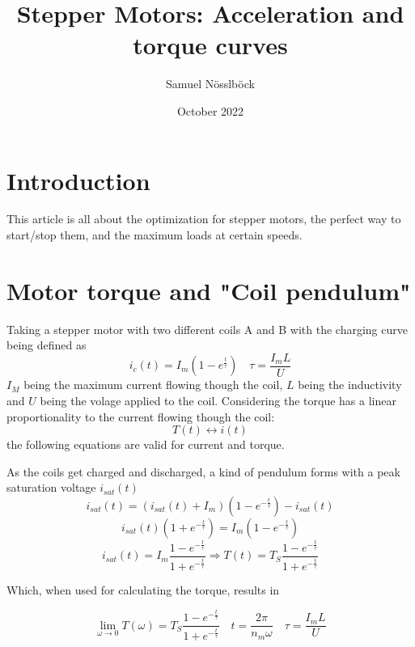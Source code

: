 \documentclass{article}
\title{Stepper Motors: Acceleration and torque curves}
\author{Samuel Nösslböck}
\date{October 2022}
\begin{document}
\maketitle

\section{Introduction}

    This article is all about the optimization for stepper motors, the perfect way to start/stop them, and the maximum loads at certain speeds.

\section{Motor torque and "Coil pendulum"}

    Taking a stepper motor with two different coils A and B with the charging curve being defined as
    \begin{equation}
        i_c(t) = I_{m} (1 - e^{\frac{t}{\tau}}) \quad \tau = \frac{I_{m}L}{U}
    \end{equation}
    $I_M$ being the maximum current flowing though the coil, $L$ being the inductivity and $U$ being the volage applied to the coil.
    Considering the torque has a linear proportionality to the current flowing though the coil:
    \[
        T(t) \leftrightarrow i(t)
    \]
    the following equations are valid for current and torque.

    As the coils get charged and discharged, a kind of pendulum forms with a peak saturation voltage $i_{sat}(t)$
    \[
        i_{sat}(t) = (i_{sat}(t) + I_m)(1 - e^{-\frac{t}{\tau}}) - i_{sat}(t)
    \]\[
        i_{sat}(t)(1 + e^{-\frac{t}{\tau}}) = I_{m}(1 - e^{-\frac{t}{\tau}})
    \]
    \begin{equation}
        i_{sat}(t) = I_m \frac{1 - e^{-\frac{t}{\tau}}}{1 + e^{-\frac{t}{\tau}}} \Rightarrow
        T(t) = T_S \frac{1 - e^{-\frac{t}{\tau}}}{1 + e^{-\frac{t}{\tau}}}
    \end{equation}

    Which, when used for calculating the torque, results in 

    \begin{equation}
        \lim_{\omega \rightarrow 0}
        T(\omega) = T_S \frac{1 - e^{-\frac{t}{\tau}}}{1 + e^{-\frac{t}{\tau}}} \quad 
        t = \frac{2\pi}{n_m\omega} \quad
        \tau = \frac{I_{m}L}{U}
    \end{equation}
\end{document}
